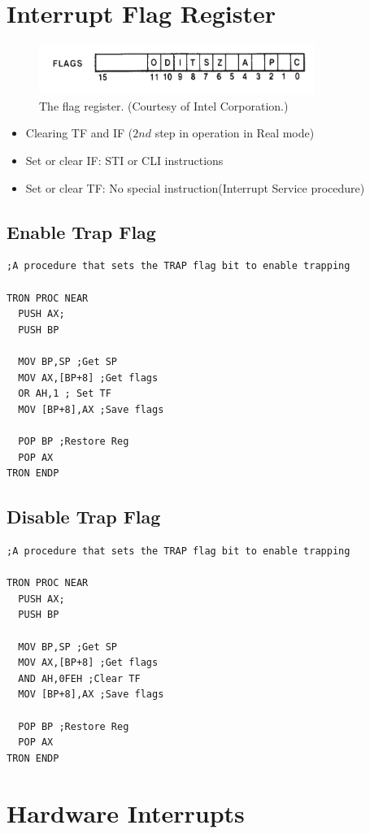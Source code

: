 \section{Interrupt Flag Register}
\begin{figure}[h!]
  \includegraphics[width = 0.8\textwidth]{./figures/IFR.png}
  \caption{The flag register. (Courtesy of Intel Corporation.)}
\end{figure}
\begin{itemize}
  \item Clearing TF and IF ($2{nd}$ step in operation in Real mode)
  \item Set or clear IF: STI or CLI instructions
  \item Set or clear TF: No special instruction(Interrupt Service procedure)
\end{itemize}
\subsection{Enable Trap Flag}

\begin{lstlisting}
;A procedure that sets the TRAP flag bit to enable trapping

TRON PROC NEAR
  PUSH AX;
  PUSH BP

  MOV BP,SP ;Get SP
  MOV AX,[BP+8] ;Get flags
  OR AH,1 ; Set TF
  MOV [BP+8],AX ;Save flags

  POP BP ;Restore Reg
  POP AX
TRON ENDP
\end{lstlisting}
\subsection{Disable Trap Flag}

\begin{lstlisting}
;A procedure that sets the TRAP flag bit to enable trapping

TRON PROC NEAR
  PUSH AX;
  PUSH BP

  MOV BP,SP ;Get SP
  MOV AX,[BP+8] ;Get flags
  AND AH,0FEH ;Clear TF
  MOV [BP+8],AX ;Save flags

  POP BP ;Restore Reg
  POP AX
TRON ENDP
\end{lstlisting}

\section{Hardware Interrupts}

